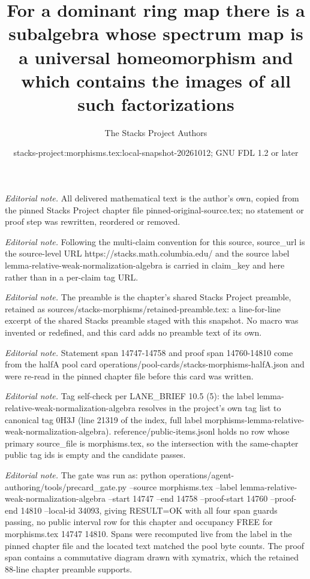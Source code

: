 \documentclass[10pt,a4paper]{amsart}
\title{For a dominant ring map there is a subalgebra whose spectrum map is a universal homeomorphism and which contains the images of all such factorizations}
\author{The Stacks Project Authors}
\date{stacks-project:morphisms.tex:local-snapshot-20261012; GNU FDL 1.2 or later}
\theoremstyle{plain}
\theoremstyle{definition}
\theoremstyle{remark}
\numberwithin{equation}{subsection}
\begin{document}
\maketitle
\noindent\textit{Editorial note.} All delivered mathematical text is the author's own, copied from the pinned Stacks Project chapter file pinned-original-source.tex; no statement or proof step was rewritten, reordered or removed.\par\medskip
\noindent\textit{Editorial note.} Following the multi-claim convention for this source, source\_url is the source-level URL https://stacks.math.columbia.edu/ and the source label lemma-relative-weak-normalization-algebra is carried in claim\_key and here rather than in a per-claim tag URL.\par\medskip
\noindent\textit{Editorial note.} The preamble is the chapter's shared Stacks Project preamble, retained as sources/stacks-morphisms/retained-preamble.tex: a line-for-line excerpt of the shared Stacks preamble staged with this snapshot. No macro was invented or redefined, and this card adds no preamble text of its own.\par\medskip
\noindent\textit{Editorial note.} Statement span 14747-14758 and proof span 14760-14810 come from the halfA pool card operations/pool-cards/stacks-morphisms-halfA.json and were re-read in the pinned chapter file before this card was written.\par\medskip
\noindent\textit{Editorial note.} Tag self-check per LANE\_BRIEF 10.5 (5): the label lemma-relative-weak-normalization-algebra resolves in the project's own tag list to canonical tag 0H3J (line 21319 of the index, full label morphisms-lemma-relative-weak-normalization-algebra). reference/public-items.jsonl holds no row whose primary source\_file is morphisms.tex, so the intersection with the same-chapter public tag ids is empty and the candidate passes.\par\medskip
\noindent\textit{Editorial note.} The gate was run as: python operations/agent-authoring/tools/precard\_gate.py --source morphisms.tex --label lemma-relative-weak-normalization-algebra --start 14747 --end 14758 --proof-start 14760 --proof-end 14810 --local-id 34093, giving RESULT=OK with all four span guards passing, no public interval row for this chapter and occupancy FREE for morphisms.tex 14747 14810. Spans were recomputed live from the label in the pinned chapter file and the located text matched the pool byte counts. The proof span contains a commutative diagram drawn with xymatrix, which the retained 88-line chapter preamble supports.\par\medskip
\end{document}
